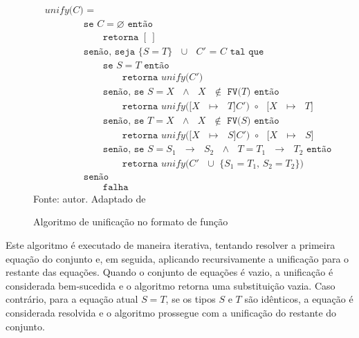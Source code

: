 \begin{figure}[ht!]
  \caption{Algoritmo de unificação no formato de função}
  \centering
  \begin{align*}
     & \texttt{$unify$($C$) =}                                                                                     \\
     & \qquad{}\qquad{}\texttt{se $C = \varnothing$ então}                                                         \\
     & \qquad{}\qquad{}\qquad{}\texttt{retorna $[\ ]$}                                                             \\
     & \qquad{}\qquad{}\texttt{senão, seja $\{ S = T \}$ $\cup$ $C'$ = $C$ tal que}                                \\
     & \qquad{}\qquad{}\qquad{}\texttt{se $S = T$ então}                                                           \\
     & \qquad{}\qquad{}\qquad{}\qquad{}\texttt{retorna $unify$($C'$)}                                              \\
     & \qquad{}\qquad{}\qquad{}\texttt{senão, se $S = X$ $\land$ $X$ $\notin$ FV($T$) então}                       \\
     & \qquad{}\qquad{}\qquad{}\qquad{}\texttt{retorna $unify$($[X$ $\mapsto$ $T]C'$) $\circ$ $[X$ $\mapsto$ $T]$} \\
     & \qquad{}\qquad{}\qquad{}\texttt{senão, se $T = X$ $\land$ $X$ $\notin$ FV($S$) então}                       \\
     & \qquad{}\qquad{}\qquad{}\qquad{}\texttt{retorna $unify$($[X$ $\mapsto$ $S]C'$) $\circ$ $[X$ $\mapsto$ $S]$} \\
     & \qquad{}\qquad{}\qquad{}\texttt{senão, se $S = S_1$ $\to$ $S_2$ $\land$ $T = T_1$ $\to$ $T_2$ então}        \\
     & \qquad{}\qquad{}\qquad{}\qquad{}\texttt{retorna $unify$($C'$ $\cup$ \{$S_1 = T_1$,\ $S_2 = T_2$\})}         \\
     & \qquad{}\qquad{}\texttt{senão}                                                                              \\
     & \qquad{}\qquad{}\qquad{}\texttt{falha}
  \end{align*}
  \small{Fonte: autor. Adaptado de~\cite{PIERCE2002}}\label{fig:unify-algo}
\end{figure}

Este algoritmo é executado de maneira iterativa, tentando resolver a primeira equação do conjunto e, em seguida, aplicando recursivamente a unificação para o restante das equações.
Quando o conjunto de equações é vazio, a unificação é considerada bem-sucedida e o algoritmo retorna uma substituição vazia.
Caso contrário, para a equação atual $S = T$, se os tipos $S$ e $T$ são idênticos, a equação é considerada resolvida e o algoritmo prossegue com a unificação do restante do conjunto.

